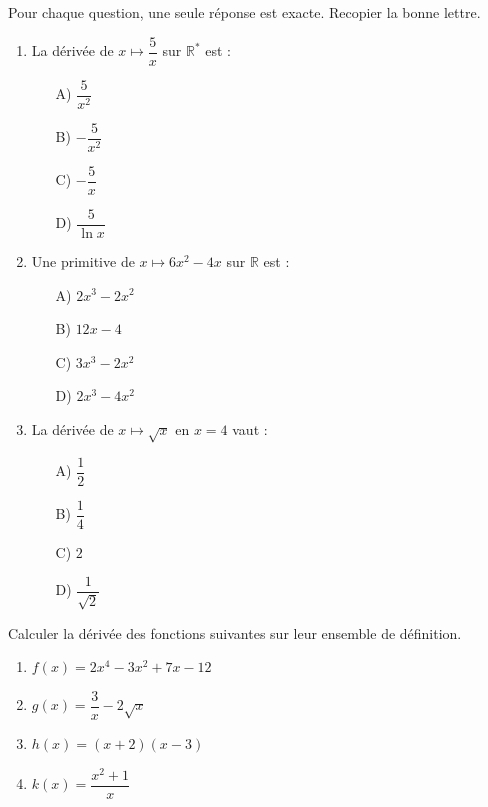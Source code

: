 \documentclass[11pt]{article}
\begin{document}
\begin{exercice}
Pour chaque question, une seule réponse est exacte. Recopier la bonne lettre.
\begin{enumerate}
    \item La dérivée de $x \mapsto \dfrac{5}{x}$ sur $\mathbb{R}^*$ est :
    \begin{itemize}
        \item[A)] $\dfrac{5}{x^2}$
        \item[B)] $-\dfrac{5}{x^2}$
        \item[C)] $-\dfrac{5}{x}$
        \item[D)] $\dfrac{5}{\ln x}$
    \end{itemize}
    \item Une primitive de $x \mapsto 6x^2 - 4x$ sur $\mathbb{R}$ est :
    \begin{itemize}
        \item[A)] $2x^3 - 2x^2$
        \item[B)] $12x - 4$
        \item[C)] $3x^3 - 2x^2$
        \item[D)] $2x^3 - 4x^2$
    \end{itemize}
    \item La dérivée de $x \mapsto \sqrt{x}$ en $x=4$ vaut :
    \begin{itemize}
        \item[A)] $\dfrac{1}{2}$
        \item[B)] $\dfrac{1}{4}$
        \item[C)] $2$
        \item[D)] $\dfrac{1}{\sqrt{2}}$
    \end{itemize}
\end{enumerate}
\end{exercice}

\begin{exercice}
Calculer la dérivée des fonctions suivantes sur leur ensemble de définition.
\begin{enumerate}
    \item $f(x) = 2x^4 - 3x^2 + 7x - 12$
    \item $g(x) = \dfrac{3}{x} - 2\sqrt{x}$
    \item $h(x) = (x+2)(x-3)$
    \item $k(x) = \dfrac{x^2 + 1}{x}$
\end{enumerate}
\end{exercice}
\end{document}
